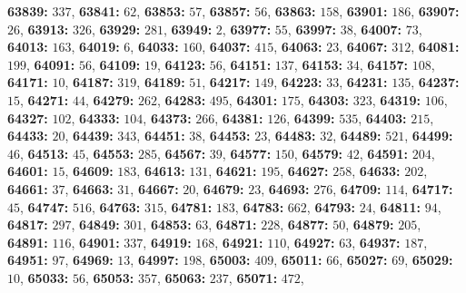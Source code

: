 \textsf{\bfseries 63839:} $337$, \textsf{\bfseries 63841:} $62$, \textsf{\bfseries 63853:} $57$, \textsf{\bfseries 63857:} $56$, \textsf{\bfseries 63863:} $158$, \textsf{\bfseries 63901:} $186$, \textsf{\bfseries 63907:} $26$, \textsf{\bfseries 63913:} $326$, \textsf{\bfseries 63929:} $281$, \textsf{\bfseries 63949:} $2$, \textsf{\bfseries 63977:} $55$, \textsf{\bfseries 63997:} $38$, \textsf{\bfseries 64007:} $73$, \textsf{\bfseries 64013:} $163$, \textsf{\bfseries 64019:} $6$, \textsf{\bfseries 64033:} $160$, \textsf{\bfseries 64037:} $415$, \textsf{\bfseries 64063:} $23$, \textsf{\bfseries 64067:} $312$, \textsf{\bfseries 64081:} $199$, \textsf{\bfseries 64091:} $56$, \textsf{\bfseries 64109:} $19$, \textsf{\bfseries 64123:} $56$, \textsf{\bfseries 64151:} $137$, \textsf{\bfseries 64153:} $34$, \textsf{\bfseries 64157:} $108$, \textsf{\bfseries 64171:} $10$, \textsf{\bfseries 64187:} $319$, \textsf{\bfseries 64189:} $51$, \textsf{\bfseries 64217:} $149$, \textsf{\bfseries 64223:} $33$, \textsf{\bfseries 64231:} $135$, \textsf{\bfseries 64237:} $15$, \textsf{\bfseries 64271:} $44$, \textsf{\bfseries 64279:} $262$, \textsf{\bfseries 64283:} $495$, \textsf{\bfseries 64301:} $175$, \textsf{\bfseries 64303:} $323$, \textsf{\bfseries 64319:} $106$, \textsf{\bfseries 64327:} $102$, \textsf{\bfseries 64333:} $104$, \textsf{\bfseries 64373:} $266$, \textsf{\bfseries 64381:} $126$, \textsf{\bfseries 64399:} $535$, \textsf{\bfseries 64403:} $215$, \textsf{\bfseries 64433:} $20$, \textsf{\bfseries 64439:} $343$, \textsf{\bfseries 64451:} $38$, \textsf{\bfseries 64453:} $23$, \textsf{\bfseries 64483:} $32$, \textsf{\bfseries 64489:} $521$, \textsf{\bfseries 64499:} $46$, \textsf{\bfseries 64513:} $45$, \textsf{\bfseries 64553:} $285$, \textsf{\bfseries 64567:} $39$, \textsf{\bfseries 64577:} $150$, \textsf{\bfseries 64579:} $42$, \textsf{\bfseries 64591:} $204$, \textsf{\bfseries 64601:} $15$, \textsf{\bfseries 64609:} $183$, \textsf{\bfseries 64613:} $131$, \textsf{\bfseries 64621:} $195$, \textsf{\bfseries 64627:} $258$, \textsf{\bfseries 64633:} $202$, \textsf{\bfseries 64661:} $37$, \textsf{\bfseries 64663:} $31$, \textsf{\bfseries 64667:} $20$, \textsf{\bfseries 64679:} $23$, \textsf{\bfseries 64693:} $276$, \textsf{\bfseries 64709:} $114$, \textsf{\bfseries 64717:} $45$, \textsf{\bfseries 64747:} $516$, \textsf{\bfseries 64763:} $315$, \textsf{\bfseries 64781:} $183$, \textsf{\bfseries 64783:} $662$, \textsf{\bfseries 64793:} $24$, \textsf{\bfseries 64811:} $94$, \textsf{\bfseries 64817:} $297$, \textsf{\bfseries 64849:} $301$, \textsf{\bfseries 64853:} $63$, \textsf{\bfseries 64871:} $228$, \textsf{\bfseries 64877:} $50$, \textsf{\bfseries 64879:} $205$, \textsf{\bfseries 64891:} $116$, \textsf{\bfseries 64901:} $337$, \textsf{\bfseries 64919:} $168$, \textsf{\bfseries 64921:} $110$, \textsf{\bfseries 64927:} $63$, \textsf{\bfseries 64937:} $187$, \textsf{\bfseries 64951:} $97$, \textsf{\bfseries 64969:} $13$, \textsf{\bfseries 64997:} $198$, \textsf{\bfseries 65003:} $409$, \textsf{\bfseries 65011:} $66$, \textsf{\bfseries 65027:} $69$, \textsf{\bfseries 65029:} $10$, \textsf{\bfseries 65033:} $56$, \textsf{\bfseries 65053:} $357$, \textsf{\bfseries 65063:} $237$, \textsf{\bfseries 65071:} $472$, 
